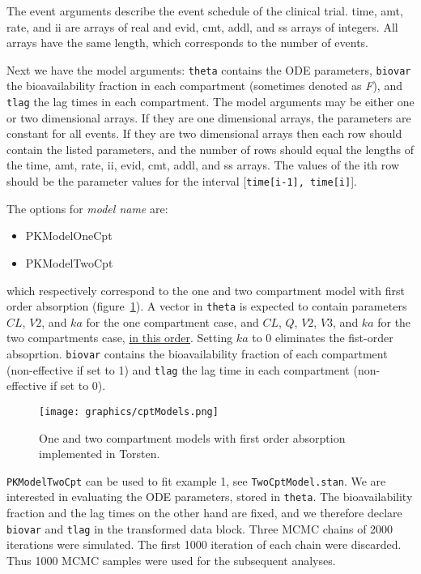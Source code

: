 \documentclass[11pt]{amsart}
\begin{document}
The event arguments describe the event schedule of the clinical trial. time, amt, rate,  and ii are arrays of real and evid, cmt, addl, and ss arrays of integers. All arrays have the same length, which corresponds to the number of events.

Next we have the model arguments: \texttt{theta} contains the ODE parameters, \texttt{biovar} the bioavailability fraction in each compartment (sometimes denoted as \textit{F}), and \texttt{tlag} the lag times in each compartment.  The model arguments may be either one or two dimensional arrays. If they are one dimensional arrays, the parameters are constant for all events. If they are two dimensional arrays then each row should contain the listed parameters, and the number of rows should equal the lengths of the time, amt, rate, ii, evid, cmt, addl, and ss arrays. The values of the ith row should be the parameter values for the interval [\texttt{time[i-1], time[i]}]. 

The options for \textit{model name} are:
\begin{itemize}
  \item PKModelOneCpt
  \item PKModelTwoCpt
\end{itemize}
which respectively correspond to the one and two compartment model with first order absorption (figure~\ref{cptModels}). A vector in \texttt{theta} is expected to contain parameters $CL$, $V2$, and $ka$ for the one compartment case, and $CL$, $Q$, $V2$, $V3$, and $ka$ for the two compartments case, \underline{in this order}. Setting $ka$ to 0 eliminates the fist-order absoprtion. \texttt{biovar} contains the bioavailability fraction of each compartment (non-effective if set to 1) and \texttt{tlag} the lag time in each compartment (non-effective if set to 0).

\begin{figure}[htbp]
\texttt{[image: graphics/cptModels.png]}
\caption{One and two compartment models with first order absorption implemented in Torsten.}
\label{cptModels}
\end{figure}

\texttt{PKModelTwoCpt} can be used to fit example 1, see \texttt{TwoCptModel.stan}. We are interested in evaluating the ODE parameters, stored in \texttt{theta}. The bioavailability fraction and the lag times on the other hand are fixed, and we therefore declare \texttt{biovar} and \texttt{tlag} in the transformed data block. Three MCMC chains of 2000 iterations were simulated. The first 1000 iteration of each chain were discarded. Thus 1000 MCMC samples were used for the subsequent analyses.
\end{document}
